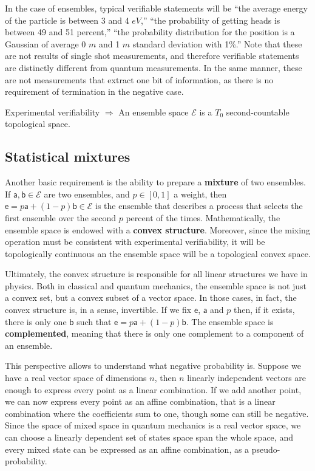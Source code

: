 \documentclass[10pt,twocolumn, nofootinbib]{revtex4-2}
\newcommand{\ens}[1][e] {\mathsf{#1}} %
\newcommand{\Ens}[1][E] {\mathcal{#1}} %
\begin{document}
In the case of ensembles, typical verifiable statements will be ``the average energy of the particle is between 3 and 4 $eV$,'' ``the probability of getting heads is between 49 and 51 percent,'' ``the probability distribution for the position is a Gaussian of average 0 $m$ and 1 $m$ standard deviation with 1\%.'' Note that these are not results of single shot measurements, and therefore verifiable statements are distinctly different from quantum measurements. In the same manner, these are not measurements that extract one bit of information, as there is no requirement of termination in the negative case.

\begin{tcolorbox}[colback=white, colframe=black]
	Experimental verifiability $\Rightarrow$ An ensemble space $\Ens$ is a $T_0$ second-countable topological space.
\end{tcolorbox}


\subsection{Statistical mixtures}
Another basic requirement is the ability to prepare a \textbf{mixture} of two ensembles. If $\ens[a], \ens[b] \in \Ens$ are two ensembles, and $p \in [0,1]$ a weight, then $\ens = p \ens[a] + (1-p) \ens[b] \in \Ens$ is the ensemble that describes a process that selects the first ensemble over the second $p$ percent of the times. Mathematically, the ensemble space is endowed with a \textbf{convex structure}. Moreover, since the mixing operation must be consistent with experimental verifiability, it will be topologically continuous an the ensemble space will be a topological convex space.

Ultimately, the convex structure is responsible for all linear structures we have in physics. Both in classical and quantum mechanics, the ensemble space is not just a convex set, but a convex subset of a vector space. In those cases, in fact, the convex structure is, in a sense, invertible. If we fix $\ens$, $\ens[a]$ and $p$ then, if it exists, there is only one $\ens[b]$ such that $\ens = p \ens[a] + (1-p) \ens[b]$. The ensemble space is \textbf{complemented}, meaning that there is only one complement to a component of an ensemble.

This perspective allows to understand what negative probability is. Suppose we have a real vector space of dimensions $n$, then $n$ linearly independent vectors are enough to express every point as a linear combination. If we add another point, we can now express every point as an affine combination, that is a linear combination where the coefficients sum to one, though some can still be negative. Since the space of mixed space in quantum mechanics is a real vector space, we can choose a linearly dependent set of states space span the whole space, and every mixed state can be expressed as an affine combination, as a pseudo-probability.
\end{document}
